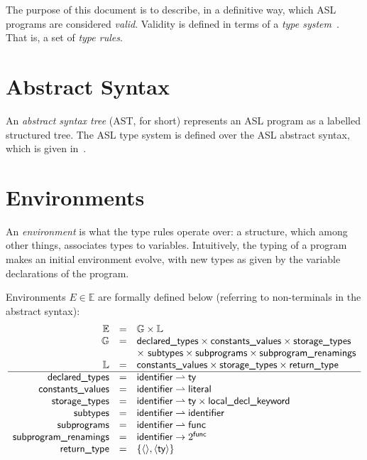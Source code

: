 \documentclass{book}
\begin{document}
The purpose of this document is to describe, in a definitive way, which ASL programs are considered \emph{valid}. Validity is defined in terms of a \emph{type system}~\cite{TypeSystemsLucaCardelli}. That is, a set of \emph{type rules}.

\section{Abstract Syntax}

An \emph{abstract syntax tree} (AST, for short) represents an ASL program as a
labelled structured tree. 
%
The ASL type system is defined over the ASL abstract syntax, which is given
in~\cite{ASLAbstractSyntaxReference}.

\section{Environments}

An \emph{environment} is what the type rules operate over: a structure, which among
other things, associates types to variables. Intuitively, the typing of a
program makes an initial environment evolve, with new types as given by the
variable declarations of the program.

Environments $E \in \mathbb{E}$ are formally defined below (referring to non-terminals in the abstract syntax):
\[
\begin{array}{rcl}
\mathbb{E} 	&=& \mathbb{G} \times \mathbb{L}\\
\mathbb{G} 	&=& \textsf{declared\_types} \times \textsf{constants\_values} \times \textsf{storage\_types}\\
  			& & \times\ \textsf{subtypes} \times \textsf{subprograms} \times \textsf{subprogram\_renamings}\\
\mathbb{L} 	&=& \textsf{constants\_values} \times \textsf{storage\_types} \times \textsf{return\_type}\\
\hline
\textsf{declared\_types}	 &=& \textsf{identifier} \rightharpoonup \textsf{ty}\\
\textsf{constants\_values} &=& \textsf{identifier} \rightharpoonup \textsf{literal}\\
\textsf{storage\_types}    &=& \textsf{identifier} \rightharpoonup \textsf{ty} \times \textsf{local\_decl\_keyword}\\
\textsf{subtypes}		 &=& \textsf{identifier} \rightharpoonup \textsf{identifier}\\
\textsf{subprograms}	 &=& \textsf{identifier} \rightharpoonup \textsf{func}\\
\textsf{subprogram\_renamings}	 &=& \textsf{identifier} \rightarrow 2^{\textsf{func}}\\
\textsf{return\_type}      &=& \{\langle\rangle, \langle \textsf{ty} \rangle\}
\end{array}
\]
\end{document}
